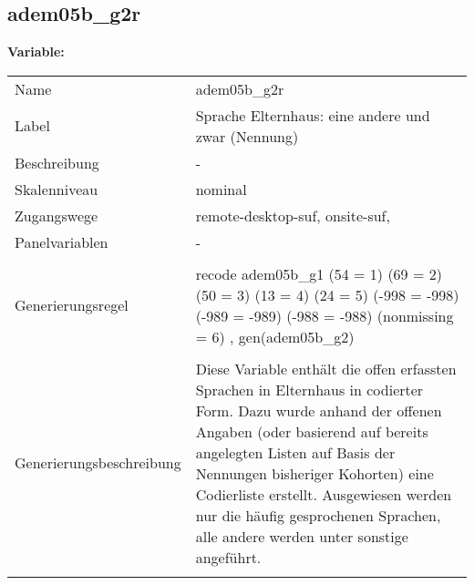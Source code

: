 	
	
	\subsection{adem05b\_g2r}
	\label{subSection:adem05b_g2r}

	\noindent\textbf{Variable:}\\
		\begin{tabular}{lL{11.3cm}}
			\label{tableVariable:adem05b_g2r}
			Name & adem05b\_g2r \\
			Label & Sprache Elternhaus: eine andere und zwar (Nennung) \\
			Beschreibung & - \\
			Skalenniveau & nominal \\
			Zugangswege &
				remote-desktop-suf,
				onsite-suf,
 \\
			Panelvariablen & -
			 \\
			 \\
					Generierungsregel & recode adem05b\_g1 (54 = 1) (69 = 2) (50 = 3) (13 = 4)
(24 = 5) (-998 = -998) (-989 = -989) (-988 = -988) 
(nonmissing = 6) , gen(adem05b\_g2) \\
				 \\
					Generierungsbeschreibung & Diese Variable enthält die offen erfassten Sprachen in Elternhaus in codierter Form. Dazu wurde anhand der offenen Angaben (oder basierend auf bereits angelegten Listen auf Basis der Nennungen bisheriger Kohorten) eine Codierliste erstellt. Ausgewiesen werden nur die häufig gesprochenen Sprachen, alle andere werden unter sonstige angeführt.
				 \\	
			 \\
		\end{tabular}






